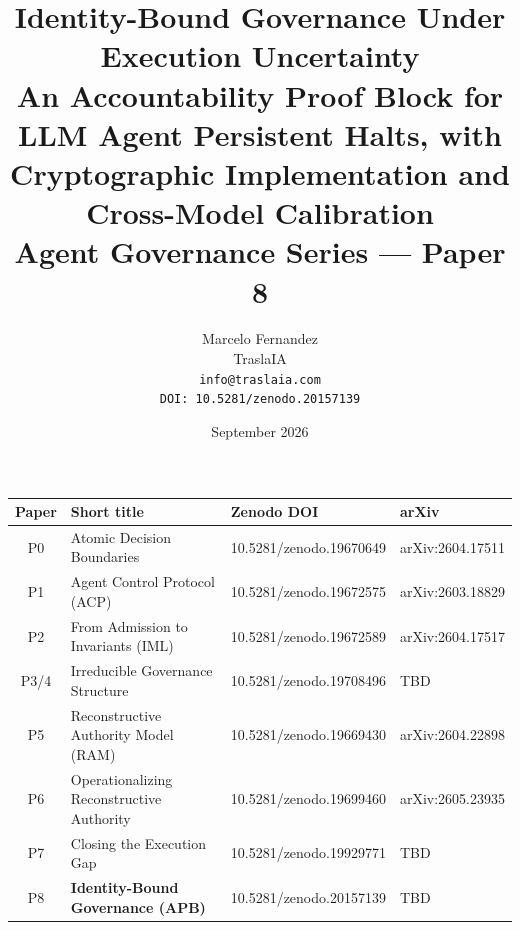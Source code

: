 \documentclass[11pt]{article}
\title{\textbf{Identity-Bound Governance Under Execution Uncertainty}\\[4pt]
       \large An Accountability Proof Block for LLM Agent Persistent Halts,
       with Cryptographic Implementation and Cross-Model Calibration\\[6pt]
       \normalsize Agent Governance Series --- Paper 8}
\author{Marcelo Fernandez\\
        \small TraslaIA\\
        \small \texttt{info@traslaia.com}\\
        \small \texttt{DOI: 10.5281/zenodo.20157139}}
\date{September 2026}
\begin{document}
\maketitle

\begin{center}
\small
\begin{tabular}{clll}
\toprule
\textbf{Paper} & \textbf{Short title} & \textbf{Zenodo DOI} & \textbf{arXiv}\\
\midrule
P0 & Atomic Decision Boundaries~\cite{fernandez2026a} & 10.5281/zenodo.19670649 & arXiv:2604.17511\\
P1 & Agent Control Protocol (ACP)~\cite{fernandez2026acp} & 10.5281/zenodo.19672575 & arXiv:2603.18829\\
P2 & From Admission to Invariants (IML)~\cite{fernandez2026iml} & 10.5281/zenodo.19672589 & arXiv:2604.17517\\
P3/4 & Irreducible Governance Structure~\cite{fernandez2026govstr} & 10.5281/zenodo.19708496 & TBD\\
P5 & Reconstructive Authority Model (RAM)~\cite{fernandez2026ram} & 10.5281/zenodo.19669430 & arXiv:2604.22898\\
P6 & Operationalizing Reconstructive Authority~\cite{fernandez2026opram} & 10.5281/zenodo.19699460 & arXiv:2605.23935\\
P7 & Closing the Execution Gap~\cite{fernandez2026applied} & 10.5281/zenodo.19929771 & TBD\\
P8 & \textbf{Identity-Bound Governance (APB)} & 10.5281/zenodo.20157139 & TBD\\
\bottomrule
\end{tabular}
\end{center}
\end{document}

